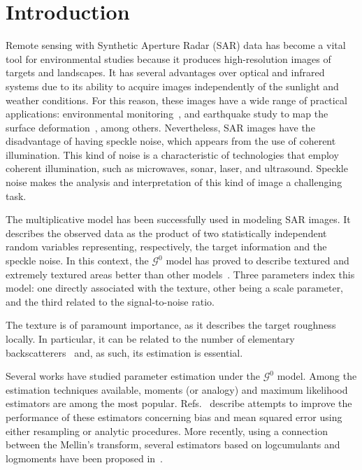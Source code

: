 \documentclass[twocolumn]{svjour3}
\begin{document}
	\section{Introduction}
	\label{intro}
	
	Remote sensing with Synthetic Aperture Radar (SAR) data has become a vital tool for environmental studies because it produces high-resolution images of targets and landscapes. 
	It has several advantages over optical and infrared systems due to its ability to acquire images independently of the sunlight and weather conditions. 
	For this reason, these images have a wide range of practical applications: environmental monitoring~\cite{White1991,Brisco2013}, and
	earthquake study to map the surface deformation~\cite{Yinghui2017}, among others.  
	Nevertheless, SAR images have the disadvantage of having speckle noise, which appears from the use of coherent illumination. 
	This kind of noise is a characteristic of technologies that
	employ coherent illumination, such as microwaves, sonar, laser, and ultrasound. 
	Speckle noise makes the analysis and interpretation of this kind of image a challenging task.
	
	The multiplicative model has been successfully used in modeling SAR images.
	It describes the observed data as the product of two statistically independent random variables representing, respectively, the target information and the speckle noise. 
	In this context, the $\mathcal{G}^0$ model has proved to describe textured and extremely textured areas better than other models~\cite{Frery97,MejailJacoboFreryBustos:IJRS}. 
	Three parameters index this model: 
	one directly associated with the texture, 
	other being a scale parameter, 
	and the third related to the signal-to-noise ratio.
	
	The texture is of paramount importance, as it describes the target roughness locally.
	In particular, it can be related to the number of elementary backscatterers~\cite{AGeneralizedGaussianCoherentScattererModelforCorrelatedSARTexture} and, as such, its estimation is essential.
	
	Several works have studied parameter estimation under the $\mathcal{G}^0$ model. 
	Among the estimation techniques available, moments (or analogy) and maximum likelihood estimators are among the most popular. 
	Refs.~\cite{VasconcellosFrerySilva:CompStat,CribariFrerySilva:CSDA} describe attempts to improve the performance of these estimators concerning bias and mean squared error using either resampling or analytic procedures. More recently, using a connection between the Mellin's transform, several estimators based on logcumulants and logmoments have been proposed in~\cite{MellinAnalysisPolSAR,BujorTrouveValetNicolas2004,khan2014}. 
	
\end{document}

